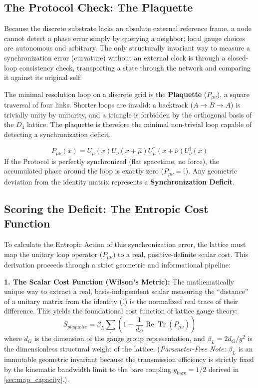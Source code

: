 \subsection{The Protocol Check: The Plaquette}

Because the discrete substrate lacks an absolute external reference frame, a node cannot detect a phase error simply by querying a neighbor; local gauge choices are autonomous and arbitrary. The only structurally invariant way to measure a synchronization error (curvature) without an external clock is through a closed-loop consistency check, transporting a state through the network and comparing it against its original self. 

The minimal resolution loop on a discrete grid is the \textbf{Plaquette} ($P_{\mu\nu}$), a square traversal of four links. Shorter loops are invalid: a backtrack ($A \to B \to A$) is trivially unity by unitarity, and a triangle is forbidden by the orthogonal basis of the $D_4$ lattice. The plaquette is therefore the minimal non-trivial loop capable of detecting a synchronization deficit.

\begin{equation}
    P_{\mu\nu}(x) = U_\mu(x) U_\nu(x+\hat{\mu}) U^\dagger_\mu(x+\hat{\nu}) U^\dagger_\nu(x)
\end{equation}
If the Protocol is perfectly synchronized (flat spacetime, no force), the accumulated phase around the loop is exactly zero ($P_{\mu\nu} = \mathbb{I}$). Any geometric deviation from the identity matrix represents a \textbf{Synchronization Deficit}.

\subsection{Scoring the Deficit: The Entropic Cost Function}

To calculate the Entropic Action of this synchronization error, the lattice must map the unitary loop operator ($P_{\mu\nu}$) to a real, positive-definite scalar cost. This derivation proceeds through a strict geometric and informational pipeline:

\textbf{1. The Scalar Cost Function (Wilson's Metric):} 
The mathematically unique way to extract a real, basis-independent scalar measuring the ``distance'' of a unitary matrix from the identity ($\mathbb{I}$) is the normalized real trace of their difference. This yields the foundational cost function of lattice gauge theory:
\begin{equation}
    S_{plaquette} = \beta_L \sum_{\square} \left( 1 - \frac{1}{d_G} \operatorname{Re} \operatorname{Tr}(P_{\mu\nu}) \right)
\end{equation}
where $d_G$ is the dimension of the gauge group representation, and $\beta_L = 2d_G/g^2$ is the dimensionless structural weight of the lattice. (\textit{Parameter-Free Note:} $\beta_L$ is an immutable geometric invariant because the transmission efficiency is strictly fixed by the kinematic bandwidth limit to the bare coupling $g_{\mathrm{bare}} = 1/2$ derived in \cref{sec:map_capacity}.).

